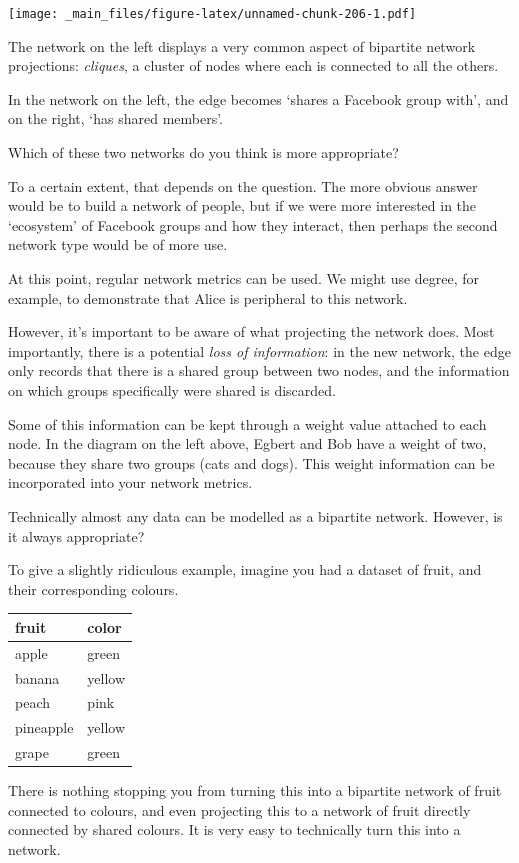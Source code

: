\documentclass[
]{book}
\begin{document}
\texttt{[image: \_main\_files/figure-latex/unnamed-chunk-206-1.pdf]}

The network on the left displays a very common aspect of bipartite network projections: \emph{cliques}, a cluster of nodes where each is connected to all the others.

In the network on the left, the edge becomes `shares a Facebook group with', and on the right, `has shared members'.

Which of these two networks do you think is more appropriate?

To a certain extent, that depends on the question. The more obvious answer would be to build a network of people, but if we were more interested in the `ecosystem' of Facebook groups and how they interact, then perhaps the second network type would be of more use.

At this point, regular network metrics can be used. We might use degree, for example, to demonstrate that Alice is peripheral to this network.

However, it's important to be aware of what projecting the network does. Most importantly, there is a potential \emph{loss of information}: in the new network, the edge only records that there is a shared group between two nodes, and the information on which groups specifically were shared is discarded.

Some of this information can be kept through a weight value attached to each node. In the diagram on the left above, Egbert and Bob have a weight of two, because they share two groups (cats and dogs). This weight information can be incorporated into your network metrics.

Technically almost any data can be modelled as a bipartite network. However, is it always appropriate?

To give a slightly ridiculous example, imagine you had a dataset of fruit, and their corresponding colours.

\begin{tabular}[t]{ll}
\toprule
fruit & color\\
\midrule
apple & green\\
banana & yellow\\
peach & pink\\
pineapple & yellow\\
grape & green\\
\bottomrule
\end{tabular}

There is nothing stopping you from turning this into a bipartite network of fruit connected to colours, and even projecting this to a network of fruit directly connected by shared colours. It is very easy to technically turn this into a network.
\end{document}
